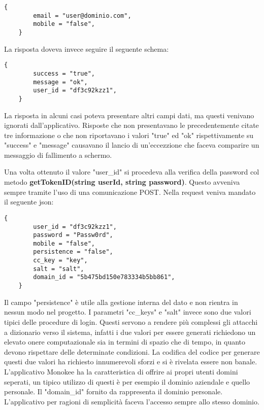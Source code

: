 \begin{lstlisting}[caption={Json della prima request di login}]
    {
        email = "user@dominio.com",
        mobile = "false",
    }
\end{lstlisting}

La risposta doveva invece seguire il seguente schema:

\begin{lstlisting}[caption={Json risposta user\_id}]
    {
        success = "true",
        message = "ok",
        user_id = "df3c92kzz1",
    }
\end{lstlisting}

La risposta in alcuni casi poteva presentare altri campi dati, ma questi venivano ignorati dall'applicativo. Risposte che non presentavano le precedentemente citate tre informazione o che non riportavano i valori "true" ed "ok" rispettivamente su "success" e "message" causavano il lancio di un'eccezzione che faceva comparire un messaggio di fallimento a schermo.

Una volta ottenuto il valore "user\_id" si procedeva alla verifica della password col metodo
\textbf{getTokenID(string userId, string password)}.
Questo avveniva sempre tramite l'uso di una comunicazione POST. Nella request veniva mandato il seguente json:

\begin{lstlisting}[caption={Json richiesta token}]
    {
        user_id = "df3c92kzz1",
        password = "Passw0rd",
        mobile = "false",
        persistence = "false",
        cc_key = "key",
        salt = "salt",
        domain_id = "5b475bd150e783334b5bb861",
    }
\end{lstlisting}

Il campo "persistence" è utile alla gestione interna del dato e non rientra in nessun modo nel progetto.
I parametri "cc\_keys" e "salt" invece sono due valori tipici delle procedure di login. Questi servono a rendere più complessi gli attacchi a dizionario verso il sistema, infatti i due valori per essere generati richiedono un elevato onere computazionale sia in termini di spazio che di tempo, in quanto devono rispettare delle determinate condizioni. La codifica del codice per generare questi due valori ha richiesto innumerevoli sforzi e si è rivelata essere non banale.
L'applicativo Monokee ha la caratteristica di offrire ai propri utenti domini seperati, un tipico utilizzo di questi è per esempio il dominio aziendale e quello personale. Il "domain\_id" fornito da rappresenta il dominio personale. L'applicativo per ragioni di semplicità faceva l'accesso sempre allo stesso dominio. 

